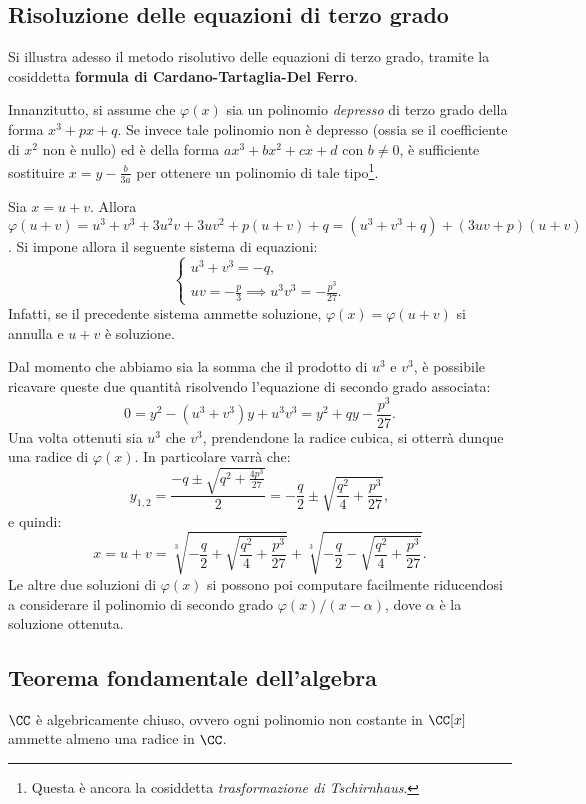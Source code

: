 \documentclass[11pt]{scrartcl}
\begin{document}
\newpage
\subsection{Risoluzione delle equazioni di terzo grado}
Si illustra adesso il metodo risolutivo delle equazioni di terzo grado,
tramite la cosiddetta \textbf{formula di Cardano-Tartaglia-Del Ferro}.\medskip


Innanzitutto, si
assume che $\varphi(x)$ sia un polinomio \textit{depresso} di terzo grado
della forma $x^3 + px + q$. Se invece tale polinomio non è depresso (ossia se il coefficiente
di $x^2$ non è nullo) ed è della forma $ax^3 + bx^2 + cx + d$ con $b \neq 0$, è sufficiente sostituire $x = y - \frac{b}{3a}$ per
ottenere un polinomio di tale tipo\footnote{
	Questa è ancora la cosiddetta \textit{trasformazione di Tschirnhaus}.
}. \medskip


Sia $x = u + v$. Allora $\varphi(u + v) = u^3 + v^3 + 3 u^2 v + 3 u v^2 + p(u + v) + q =
(u^3 + v^3 + q) + (3uv + p)(u + v)$. Si impone allora il seguente sistema di
equazioni:
\[ \begin{cases}
	u^3 + v^3 = -q, \\
	uv = -\frac{p}{3} \implies u^3 v^3 = - \frac{p^3}{27}.
\end{cases} \]
Infatti, se il precedente sistema ammette soluzione, $\varphi(x) = \varphi(u + v)$ si annulla e
$u + v$ è soluzione. \medskip


Dal momento che abbiamo sia la somma che il prodotto di $u^3$ e $v^3$, è possibile
ricavare queste due quantità risolvendo l'equazione di secondo grado
associata:
\[ 0 = y^2 - (u^3 + v^3) y + u^3 v^3 = y^2 + q y - \frac{p^3}{27}. \]
Una volta ottenuti sia $u^3$ che $v^3$, prendendone la radice cubica, si
otterrà dunque una radice di $\varphi(x)$. In particolare varrà che:
\[ y_{1,2} = \frac{-q \pm \sqrt{q^2 + \frac{4p^3}{27}}}{2} = -\frac{q}{2} \pm \sqrt{\frac{q^2}{4} + \frac{p^3}{27}}, \]
e quindi:
\[ x = u + v = \sqrt[3]{-\frac{q}{2} + \sqrt{\frac{q^2}{4} + \frac{p^3}{27}}} + \sqrt[3]{-\frac{q}{2} - \sqrt{\frac{q^2}{4} + \frac{p^3}{27}}}. \]
Le altre due soluzioni di $\varphi(x)$ si possono poi computare facilmente riducendosi
a considerare il polinomio di secondo grado $\varphi(x) / (x-\alpha)$, dove $\alpha$ è la soluzione
ottenuta.

\newpage
\subsection{Teorema fondamentale dell'algebra}
\begin{theorem}
    $\CC$ è algebricamente chiuso, ovvero ogni polinomio non costante in $\CC[x]$ ammette almeno una radice in $\CC$.
\end{theorem}
\end{document}
